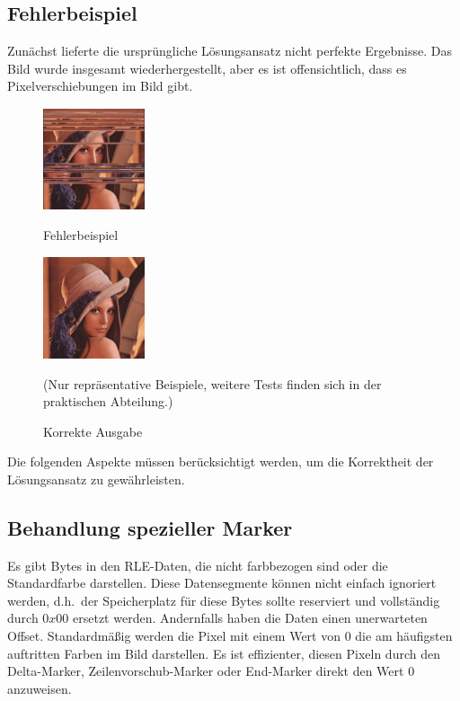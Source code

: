 \documentclass[course=erap]{aspdoc}
\begin{document}
    \subsection{Fehlerbeispiel}\label{subsec:fehlerbeispiel}
    Zunächst lieferte die ursprüngliche Lösungsansatz nicht perfekte Ergebnisse.
    Das Bild wurde insgesamt wiederhergestellt, aber es ist offensichtlich, dass es Pixelverschiebungen im Bild gibt.

    \begin{figure}[htbp]
        \begin{minipage}[t]{0.48\textwidth}
            \centering
            \includegraphics[height=3cm, width=3cm]{diagram/Lenna_mistake1}
            \caption{Fehlerbeispiel}
        \end{minipage}
        \begin{minipage}[t]{0.48\textwidth}
            \centering
            \includegraphics[height=3cm, width=3cm]{diagram/Lenna_original}
            \caption{Korrekte Ausgabe}
        \end{minipage}\label{fig:figure}
        (Nur repräsentative Beispiele, weitere Tests finden sich in der praktischen Abteilung.)
    \end{figure}
    \noindent Die folgenden Aspekte müssen berücksichtigt werden,
    um die Korrektheit der Lösungsansatz zu gewährleisten.

    \subsection{Behandlung spezieller Marker}\label{subsec:behandlung-spezieller-marker}
    Es gibt Bytes in den RLE-Daten, die nicht farbbezogen sind oder die Standardfarbe darstellen.
    Diese Datensegmente können nicht einfach ignoriert werden,
    d.h.\ der Speicherplatz für diese Bytes sollte reserviert und vollständig durch $0x00$ ersetzt werden.
    Andernfalls haben die Daten einen unerwarteten Offset.
    \newline
    \newline
    Standardmäßig werden die Pixel mit einem Wert von 0 die am häufigsten auftritten Farben im Bild darstellen.
    Es ist effizienter, diesen Pixeln durch den Delta-Marker, Zeilenvorschub-Marker oder End-Marker direkt
    den Wert 0 anzuweisen.
\end{document}

